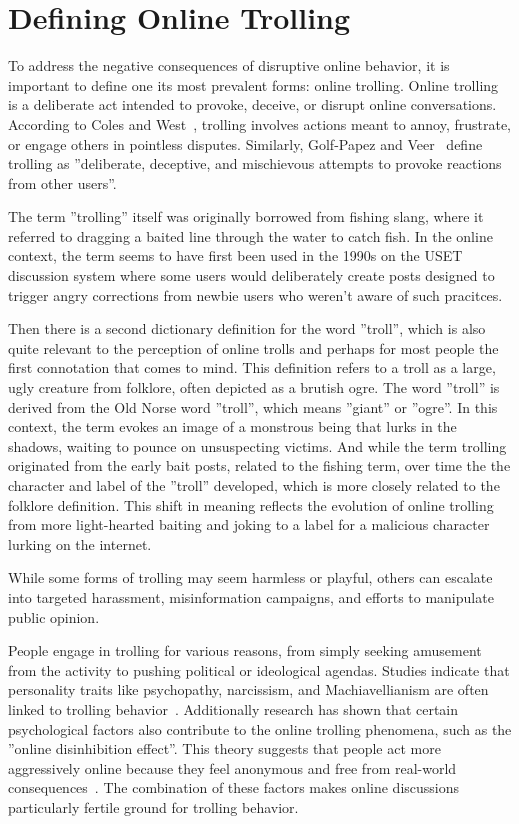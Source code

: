 \documentclass[twoside]{ctuthesis}
\theoremstyle{plain}
\theoremstyle{definition}
\theoremstyle{note}
\begin{document}
\section{Defining Online Trolling}
To address the negative consequences of disruptive online behavior, it is important to define one its most prevalent forms: online trolling. Online trolling is a deliberate act intended to provoke, deceive, or disrupt online conversations. According to Coles and West~\cite{Coles2016}, trolling involves actions meant to annoy, frustrate, or engage others in pointless disputes. Similarly, Golf-Papez and Veer~\cite{GolfPapez2017DontFeedTheTroll} define trolling as ''deliberate, deceptive, and mischievous attempts to provoke reactions from other users''.\par

The term ''trolling'' itself was originally borrowed from fishing slang, where it referred to dragging a baited line through the water to catch fish. In the online context, the term seems to have first been used  in the 1990s on the USET discussion system where some users would deliberately create posts designed to trigger angry corrections from newbie users who weren't aware of such pracitces.\par

Then there is a second dictionary definition for the word ''troll'', which is also quite relevant to the perception of online trolls and perhaps for most people the first connotation that comes to mind. This definition refers to a troll as a large, ugly creature from folklore, often depicted as a brutish ogre. The word ''troll'' is derived from the Old Norse word ''troll'', which means ''giant'' or ''ogre''. In this context, the term evokes an image of a monstrous being that lurks in the shadows, waiting to pounce on unsuspecting victims. And while the term trolling originated from the early bait posts, related to the fishing term, over time the the character and label of the ''troll'' developed, which is more closely related to the folklore definition. This shift in meaning reflects the evolution of online trolling from more light-hearted baiting and joking to a label for a malicious character lurking on the internet\cite{Demsar2021}.\par

While some forms of trolling may seem harmless or playful, others can escalate into targeted harassment, misinformation campaigns, and efforts to manipulate public opinion.\par
People engage in trolling for various reasons, from simply seeking amusement from the activity to pushing political or ideological agendas. Studies indicate that personality traits like psychopathy, narcissism, and Machiavellianism are often linked to trolling behavior~\cite{Buckels2014TrollsWantToHaveFun}. Additionally research has shown that certain psychological factors also contribute to the online trolling phenomena, such as the ''online disinhibition effect''. This theory suggests that people act more aggressively online because they feel anonymous and free from real-world consequences~\cite{Suler2004}. The combination of these factors makes online discussions particularly fertile ground for trolling behavior. \par
\end{document}
